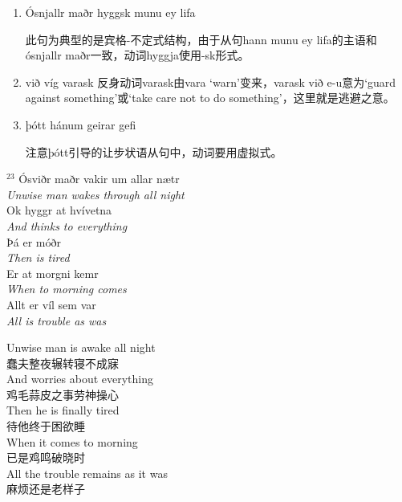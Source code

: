 \begin{grammar*}{}
    \begin{enumerate}[leftmargin=*]

        \item Ósnjallr maðr hyggsk munu ey lifa

              此句为典型的是宾格-不定式结构，由于从句hann munu ey lifa的主语和ósnjallr maðr一致，动词hyggja使用-sk形式。

        \item við víg varask
              反身动词varask由vara `warn'变来，varask við e-u意为`guard against something'或`take care not to do something'，这里就是逃避之意。

        \item þótt hánum geirar gefi

              注意þótt引导的让步状语从句中，动词要用虚拟式。

    \end{enumerate}
\end{grammar*}
\medskip %
\begin{paracol}{2}
    \noindent
    $^{23}$ Ósviðr maðr vakir um allar nætr\\
    \textit{Unwise man wakes through all night}\\
    Ok hyggr at hvívetna\\
    \textit{And thinks to everything}\\
    \MakeUppercase þá er móðr\\
    \textit{Then is tired}\\
    Er at morgni kemr\\
    \textit{When to morning comes}\\
    Allt er víl sem var\\
    \textit{All is trouble as was}\\
    \switchcolumn

    \noindent
    Unwise man is awake all night\\
    蠢夫整夜辗转寝不成寐\\
    And worries about everything\\
    鸡毛蒜皮之事劳神操心\\
    Then he is finally tired\\
    待他终于困欲睡\\
    When it comes to morning \\
    已是鸡鸣破晓时\\
    All the trouble remains as it was \\
    麻烦还是老样子\\

\end{paracol}

